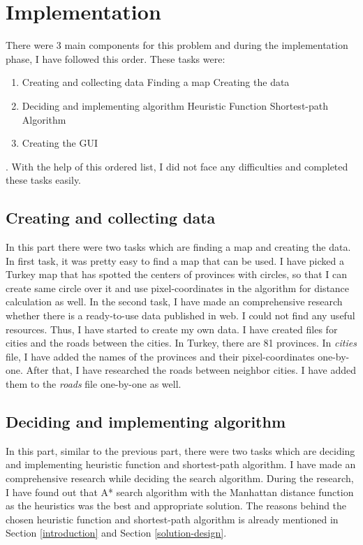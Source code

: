 \documentclass{IEEEtran}
\begin{document}
\section{Implementation}
There were 3 main components for this problem and during the implementation phase, I have followed this order. These tasks were:
\begin{enumerate}
	\item Creating and collecting data
	\subitem Finding a map
	\subitem  Creating the data
	\item Deciding and implementing algorithm
	\subitem Heuristic Function
	\subitem Shortest-path Algorithm
	\item Creating the GUI
\end{enumerate}.
With the help of this ordered list, I did not face any difficulties and completed these tasks easily.
\subsection{Creating and collecting data}
In this part there were two tasks which are finding a map and creating the data. In first task, it was pretty easy to find a map that can be used. I have picked a Turkey map that has spotted the centers of provinces with circles, so that I can create same circle over it and use pixel-coordinates in the algorithm for distance calculation as well. In the second task, I have made an comprehensive research whether there is a ready-to-use data published in web. I could not find any useful resources. Thus, I have started to create my own data. I have created files for cities and the roads between the cities. In Turkey, there are 81 provinces. In \textit{cities} file, I have added the names of the provinces and their pixel-coordinates one-by-one. After that, I have researched the roads between neighbor cities. I have added them to the \textit{roads} file one-by-one as well.

\subsection{Deciding and implementing algorithm}
In this part, similar to the previous part, there were two tasks which are deciding and implementing heuristic function and shortest-path algorithm. I have made an comprehensive research while deciding the search algorithm. During the research, I have found out that A* search algorithm with the Manhattan distance function as the heuristics was the best and appropriate solution. The reasons behind the chosen heuristic function and shortest-path algorithm is already mentioned in Section \ref{introduction} and Section \ref{solution-design}. \\
\end{document}
